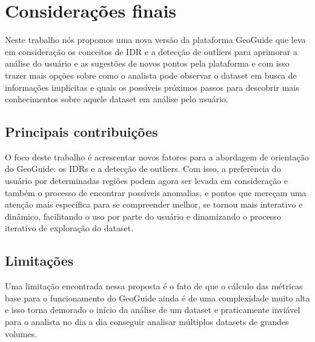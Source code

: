 \chapter{Considerações finais}


Neste trabalho nós propomos uma nova versão da plataforma GeoGuide \cite{7450552} que leva em consideração os conceitos de IDR e a detecção de outliers para aprimorar a análise do usuário e as sugestões de novos pontos pela plataforma e com isso trazer mais opções sobre como o analista pode observar o dataset em busca de informações implícitas e quais os possíveis próximos passos para descobrir mais conhecimentos sobre aquele dataset em análise pelo usuário.

\section{Principais contribuições}

O foco deste trabalho é acrescentar novos fatores para a abordagem de orientação do GeoGuide: os IDRs e a detecção de outliers. Com isso, a preferência do usuário por determinadas regiões podem agora ser levada em consideração e também o processo de encontrar possíveis anomalias, e pontos que mereçam uma atenção mais específica para se compreender melhor, se tornou mais interativo e dinâmico, facilitando o uso por parte do usuário e dinamizando o processo iterativo de exploração do dataset.

\section{Limitações}

Uma limitação encontrada nessa proposta é o fato de que o cálculo das métricas base para o funcionamento do GeoGuide ainda é de uma complexidade muito alta e isso torna demorado o início da análise de um dataset e praticamente inviável para o analista no dia a dia conseguir analisar múltiplos datasets de grandes volumes.

